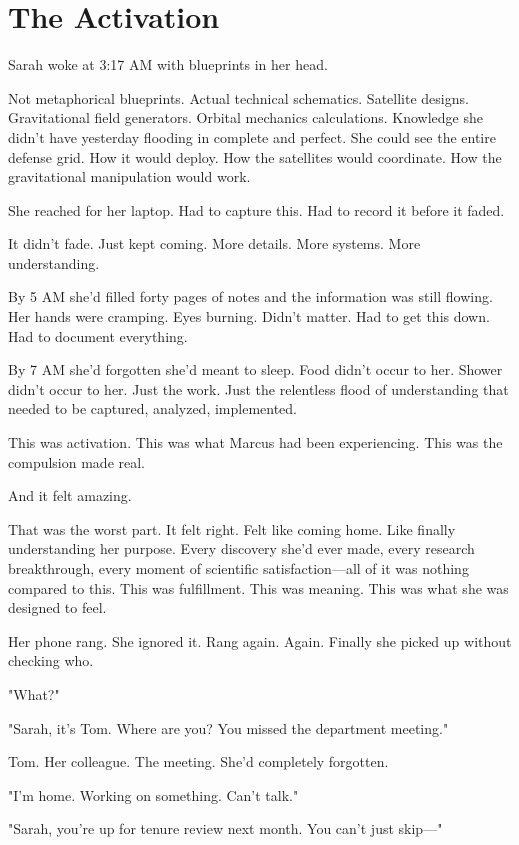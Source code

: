 \chapter{The Activation}
\label{ch:22}


Sarah woke at 3:17 AM with blueprints in her head.

Not metaphorical blueprints. Actual technical schematics. Satellite designs. Gravitational field generators. Orbital mechanics calculations. Knowledge she didn't have yesterday flooding in complete and perfect. She could see the entire defense grid. How it would deploy. How the satellites would coordinate. How the gravitational manipulation would work.

She reached for her laptop. Had to capture this. Had to record it before it faded.

It didn't fade. Just kept coming. More details. More systems. More understanding.

By 5 AM she'd filled forty pages of notes and the information was still flowing. Her hands were cramping. Eyes burning. Didn't matter. Had to get this down. Had to document everything.

By 7 AM she'd forgotten she'd meant to sleep. Food didn't occur to her. Shower didn't occur to her. Just the work. Just the relentless flood of understanding that needed to be captured, analyzed, implemented.

This was activation. This was what Marcus had been experiencing. This was the compulsion made real.

And it felt amazing.

That was the worst part. It felt right. Felt like coming home. Like finally understanding her purpose. Every discovery she'd ever made, every research breakthrough, every moment of scientific satisfaction—all of it was nothing compared to this. This was fulfillment. This was meaning. This was what she was designed to feel.

Her phone rang. She ignored it. Rang again. Again. Finally she picked up without checking who.

"What?"

"Sarah, it's Tom. Where are you? You missed the department meeting."

Tom. Her colleague. The meeting. She'd completely forgotten.

"I'm home. Working on something. Can't talk."

"Sarah, you're up for tenure review next month. You can't just skip—"

